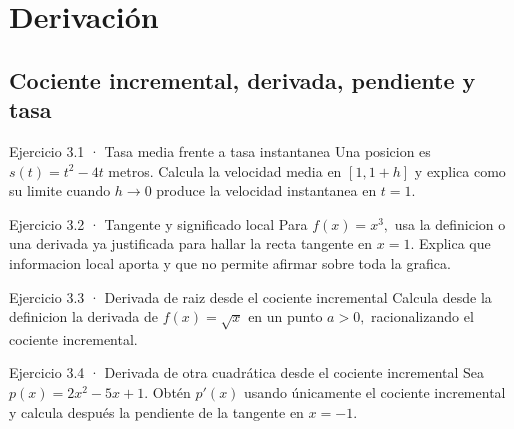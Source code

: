 \documentclass[10pt,a4paper,oneside,openany]{book}
\begin{document}
\chapter{Derivación}
\section{Cociente incremental, derivada, pendiente y tasa}
\begin{PSevenExerciseFixed}{Ejercicio 3.1 · Tasa media frente a tasa instantanea}
Una posicion es \(s(t)=t^{2}-4t\) metros. Calcula la velocidad media en \([1,1+h]\) y explica como su limite cuando \(h\to 0\) produce la velocidad instantanea en \(t=1\).
\end{PSevenExerciseFixed}
\begin{PSevenExerciseFixed}{Ejercicio 3.2 · Tangente y significado local}
Para \(f(x)=x^{3},\) usa la definicion o una derivada ya justificada para hallar la recta tangente en \(x=1\). Explica que informacion local aporta y que no permite afirmar sobre toda la grafica.
\end{PSevenExerciseFixed}
\begin{PSevenExerciseFixed}{Ejercicio 3.3 · Derivada de raiz desde el cociente incremental}
Calcula desde la definicion la derivada de \(f(x)=\sqrt{x}\) en un punto \(a>0,\) racionalizando el cociente incremental.
\end{PSevenExerciseFixed}
\begin{PSevenExerciseFixed}{Ejercicio 3.4 · Derivada de otra cuadrática desde el cociente incremental}
Sea \(p(x)=2x^{2}-5x+1\). Obtén \(p'(x)\) usando únicamente el cociente incremental y calcula después la pendiente de la tangente en \(x=-1\).
\end{PSevenExerciseFixed}
\end{document}
